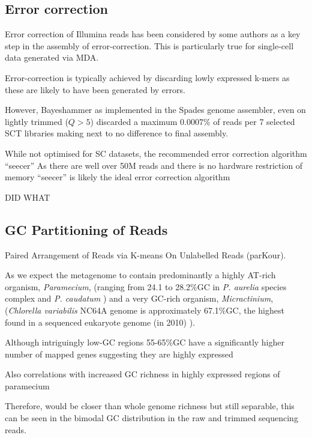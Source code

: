 \subsection{Error correction}

Error correction of Illumina reads has been considered by some authors as a key
step in the assembly of error-correction.  This is particularly true for single-cell
data generated via MDA.


Error-correction is typically achieved by discarding lowly expressed k-mers 
as these are likely to have been generated by errors.



However, Bayeshammer as implemented in the Spades genome assembler, even on lightly trimmed
(\(Q>5\)) discarded a maximum \(0.0007\%\) of reads per 7 selected SCT libraries 
making next to no difference to final assembly.


While not optimised for SC datasets, the recommended error correction
algorithm ``seecer'' 
As there are well over 50M reads and there is no hardware restriction of memory
``seecer'' is likely the ideal error correction algorithm \citep{Macmanes2015}

DID WHAT 



\subsection{GC Partitioning of Reads}


Paired Arrangement of Reads via K-means On Unlabelled Reads (parKour).

As we expect the metagenome to contain predominantly a highly AT-rich organism, \textit{Paramecium},
(ranging from 24.1 to 28.2\%GC in \textit{P. aurelia} species complex and \textit{P. caudatum} \citep{Aury2006,McGrath2014})
and a very GC-rich organism, \textit{Micractinium}, (\textit{Chlorella variabilis} NC64A genome is approximately 67.1\%GC, the highest
found in a sequenced eukaryote genome (in 2010) \citep{Blanc2010}).

Although intriguingly low-GC regions 55-65\%GC have a significantly higher number of mapped genes suggesting they are highly expressed \citep{Blanc2010}

Also correlations with increased GC richness in highly expressed regions of paramecium

Therefore,  would be closer than whole genome richness but still separable, this can be seen in the bimodal GC distribution in the raw and trimmed sequencing 
reads.

